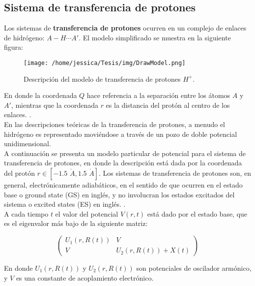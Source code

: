 \subsection{Sistema de transferencia de protones}\label{sec:ProtonTransfer}

Los sistemas de \textbf{transferencia de protones} ocurren en un complejo de enlaces de hidrógeno: $A-H\dotsb A'$. El modelo simplificado se muestra en la siguiente figura:

\begin{figure}[ht]
  \centering
\texttt{[image: /home/jessica/Tesis/img/DrawModel.png]}
\caption{Descripción del modelo de transferencia de protones $H^+$.}
\label{fig:drawmodel}
\end{figure}

En donde la coordenada $Q$ hace referencia a la separación entre los átomos $A$ y $A'$, mientras que la coordenada $r$ es la distancia del protón al centro de los enlaces. \cite{DynamicalTheoryPTS}. \\
En las descripciones teóricas de la transferencia de protones, a menudo el hidrógeno es representado moviéndose a través de un pozo de doble potencial unidimensional. \cite{Enzymes}
\\

A continuación se presenta un modelo particular de potencial para el sistema de transferencia de protones, en donde la descripción está dada por la coordenada del protón $r \in [-1.5 \,\,\mathring{A}, 1.5 \,\,\mathring{A}]$. Los sistemas de transferencia de protones son, en general, electrónicamente adiabáticos, en el sentido de que ocurren en el estado base o ground state (GS) en inglés, y no involucran los estados excitados del sistema o excited states (ES) en inglés. \cite{Enzymes}. \\
A cada tiempo $t$ el valor del potencial $V(r,t)$ está dado por el estado base, que es el eigenvalor más bajo de la siguiente matriz:

\begin{equation}
  \label{eq:matrixPot}
  \begin{pmatrix}
    U_1(r,R(t)) &   V \\
    V           & U_2(r,R(t))+X(t)
  \end{pmatrix}
\end{equation}

En donde $U_1(r,R(t))$ y  $U_2(r,R(t))$ son potenciales de oscilador armónico, y $V$ es una constante de acoplamiento electrónico.

